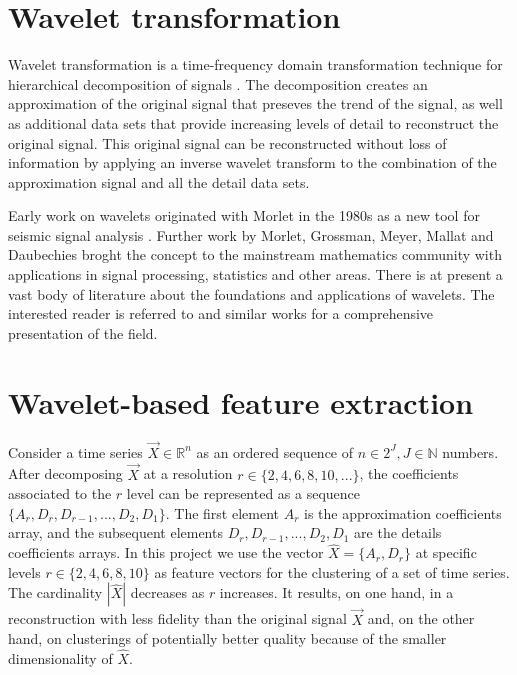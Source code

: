 \documentclass{article}
\begin{document}
\section{Wavelet transformation}

Wavelet transformation is a time-frequency domain transformation technique for hierarchical decomposition of signals \cite{C92,D92}. The decomposition creates an approximation of the original signal that preseves the trend of the signal, as well as additional data sets that provide increasing levels of detail to reconstruct the original signal. This original signal can be reconstructed without loss of information by applying an inverse wavelet transform to the combination of the approximation signal and all the detail data sets.

Early work on wavelets originated with Morlet in the 1980s as a new tool for seismic signal analysis \cite{MAFG82}. Further work by Morlet, Grossman, Meyer, Mallat and Daubechies \cite{CGT89,D88} broght the concept to the mainstream mathematics community with applications in signal processing, statistics and other areas. There is at present a vast body of literature about the foundations and applications of wavelets. The interested reader is referred to \cite{BGG98} and similar works for a comprehensive presentation of the field.


\section{Wavelet-based feature extraction}

Consider a time series $\overrightarrow{X} \in \mathbb{R}^n$ as an ordered sequence of $n \in 2^J, J \in \mathbb{N}$ numbers. After decomposing $\overrightarrow{X}$ at a resolution $r \in \{2,4,6,8,10, ...\}$, the coefficients associated to the $r$ level can be represented as a sequence $\{A_r,D_r,D_{r-1},...,D_2,D_1\}$. The first element $A_r$ is the approximation coefficients array, and the subsequent elements $D_r,D_{r-1},...,D_2,D_1$ are the details coefficients arrays. In this project we use the vector $\widehat{X} = \{A_r,D_r\}$ at specific levels $r \in \{2,4,6,8,10\}$ as feature vectors for the clustering of a set of time series. The cardinality $|\widehat{X}|$ decreases as $r$ increases. It results, on one hand, in a reconstruction with less fidelity than the original signal $\overrightarrow{X}$ and, on the other hand, on clusterings of potentially better quality because of the smaller dimensionality of $\widehat{X}$.
\end{document}
